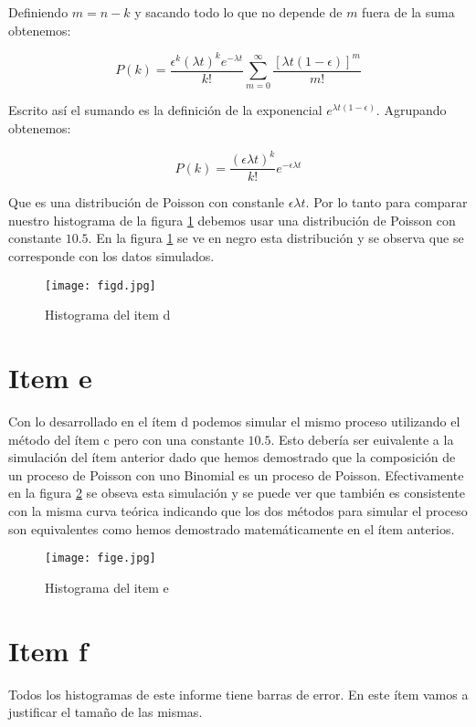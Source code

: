 \documentclass{article}
\begin{document}
Definiendo $m=n-k$ y sacando todo lo que no depende de $m$ fuera de la suma obtenemos:

$$
P(k) = \frac{\epsilon^k (\lambda t)^k e^{-\lambda t}}{k!} \sum_{m=0}^{\infty} \frac{[\lambda t(1- \epsilon)]^m}{m!}
$$

Escrito así el sumando es la definición de la exponencial $e^{\lambda t(1- \epsilon)}$.
Agrupando obtenemos:

$$
P(k) = \frac{(\epsilon \lambda t)^k}{k!} e^{-\epsilon \lambda t}
$$

Que es una distribución de Poisson con constanle $\epsilon \lambda t$.
Por lo tanto para comparar nuestro histograma de la figura \ref{fig:itemd} debemos usar una distribución de Poisson con constante $10.5$.
En la figura \ref{fig:itemd} se ve en negro esta distribución y se observa que se corresponde con los datos simulados.


\begin{figure}
\centering
\texttt{[image: figd.jpg]}
\caption[]{Histograma del item d}
\label{fig:itemd}
\end{figure}

\section{Item e}

Con lo desarrollado en el ítem d podemos simular el mismo proceso utilizando el método del ítem c pero con una constante $10.5$.
Esto debería ser euivalente a la simulación del ítem anterior dado que hemos demostrado que la composición de un proceso de Poisson con uno Binomial es un proceso de Poisson.
Efectivamente en la figura \ref{fig:iteme} se obseva esta simulación y se puede ver que también es consistente con la misma curva teórica indicando que los dos métodos para simular el proceso son equivalentes como hemos demostrado matemáticamente en el ítem anterios.

\begin{figure}
\centering
\texttt{[image: fige.jpg]}
\caption[]{Histograma del item e}
\label{fig:iteme}
\end{figure}

\section{Item f}
Todos los histogramas de este informe tiene barras de error.
En este ítem vamos a justificar el tamaño de las mismas.
\end{document}

